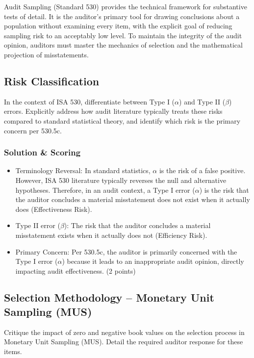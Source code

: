 \documentclass[12pt,a4paper]{memoir}
\begin{document}
Audit Sampling (Standard 530) provides the technical framework for substantive tests of detail. It is the auditor's primary tool for drawing conclusions about a population without examining every item, with the explicit goal of reducing sampling risk to an acceptably low level. To maintain the integrity of the audit opinion, auditors must master the mechanics of selection and the mathematical projection of misstatements.

\subsection{Risk Classification}

In the context of ISA 530, differentiate between Type I ($\alpha$) and Type II ($\beta$) errors. Explicitly address how audit literature typically treats these risks compared to standard statistical theory, and identify which risk is the primary concern per 530.5c.

\subsubsection{Solution \& Scoring}
\begin{itemize}
\item Terminology Reversal: In standard statistics, $\alpha$ is the risk of a false positive. However, ISA 530 literature typically reverses the null and alternative hypotheses. Therefore, in an audit context, a Type I error ($\alpha$) is the risk that the auditor concludes a material misstatement does not exist when it actually does (Effectiveness Risk).
\item Type II error ($\beta$): The risk that the auditor concludes a material misstatement exists when it actually does not (Efficiency Risk).
\item Primary Concern: Per 530.5c, the auditor is primarily concerned with the Type I error ($\alpha$) because it leads to an inappropriate audit opinion, directly impacting audit effectiveness. (2 points)
\end{itemize}

\subsection{Selection Methodology -- Monetary Unit Sampling (MUS)}

Critique the impact of zero and negative book values on the selection process in Monetary Unit Sampling (MUS). Detail the required auditor response for these items.
\end{document}

